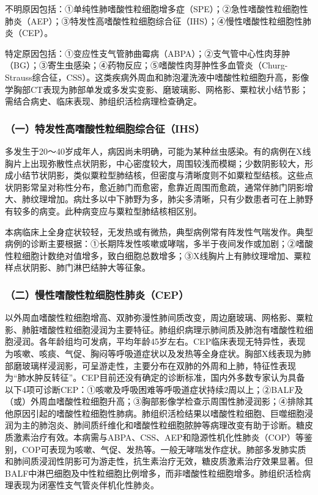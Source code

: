 不明原因包括：①单纯性肺嗜酸性粒细胞增多症（SPE）；②急性嗜酸性粒细胞性肺炎（AEP）；③特发性高嗜酸性粒细胞综合征（IHS）；④慢性嗜酸性粒细胞性肺炎（CEP）。

特定原因包括：①变应性支气管肺曲霉病（ABPA）；②支气管中心性肉芽肿（BG）；③寄生虫感染；④药物反应；⑤嗜酸性肉芽肿性多血管炎（Churg-Strauss综合征，CSS）。这类疾病外周血和肺泡灌洗液中嗜酸性粒细胞升高，影像学胸部CT表现为肺部单发或多发实变影、磨玻璃影、网格影、粟粒状小结节影；需结合病史、临床表现、肺组织活检病理检查确定。

\subsubsection{（一）特发性高嗜酸性粒细胞综合征（IHS）}

多发生于20～40岁成年人，病因尚未明确，可能为某种丝虫感染。有的病例在X线胸片上出现弥散性点状阴影，中心密度较大，周围较浅而模糊；少数阴影较大，形成小结节状阴影，类似粟粒型肺结核，但密度与清晰度则不如粟粒型结核。这些点状阴影常呈对称性分布，愈近肺门而愈密，愈靠近周围而愈疏，通常伴肺门阴影增大、肺纹理增加。病灶多以中下肺野为多，肺尖多清晰，只有少数患者可在上肺野有较多的病变。此种病变应与粟粒型肺结核相区别。

本病临床上全身症状较轻，无发热或有微热，典型病例常有阵发性气喘发作。典型病例的诊断主要根据：①长期阵发性咳嗽或哮喘，多半于夜间发作或加剧；②嗜酸性粒细胞计数绝对值增多，致白细胞总数增多；③X线胸片上有肺纹理增加、粟粒样点状阴影、肺门淋巴结肿大等征象。

\subsubsection{（二）慢性嗜酸性粒细胞性肺炎（CEP）}

以外周血嗜酸性粒细胞增高、双肺弥漫性肺间质改变，周边磨玻璃、网格影、粟粒影、肺脏嗜酸性粒细胞浸润为主要特征。肺组织病理示肺间质及肺泡有嗜酸性粒细胞浸润。各年龄组均可发病，平均年龄45岁左右。CEP临床表现无特异性，表现为咳嗽、咳痰、气促、胸闷等呼吸道症状以及发热等全身症状。胸部X线表现为肺部磨玻璃样浸润影，可呈游走性，主要分布在双肺的外周和上肺，特征性表现为“肺水肿反转征”。CEP目前还没有确定的诊断标准，国内外多数专家认为具备以下4项可诊断CEP：①咳嗽及呼吸困难等呼吸道症状持续2周以上；②BALF及（或）外周血嗜酸性粒细胞升高；③胸部影像学检查示周围性肺浸润影；④排除其他原因引起的嗜酸性粒细胞性肺病。肺组织活检结果以嗜酸性粒细胞、巨噬细胞浸润为主的肺泡炎、肺间质纤维化和嗜酸性粒细胞脓肿等病理改变有助于诊断。糖皮质激素治疗有效。本病需与ABPA、CSS、AEP和隐源性机化性肺炎（COP）等鉴别，COP可表现为咳嗽、气促、发热等。一般无哮喘发作症状。肺部多发肺实质和肺间质浸润性阴影可为游走性，抗生素治疗无效，糖皮质激素治疗效果显著。但BALF中淋巴细胞及中性粒细胞比例增多，而非嗜酸性粒细胞增多。肺组织活检病理表现为闭塞性支气管炎伴机化性肺炎。

